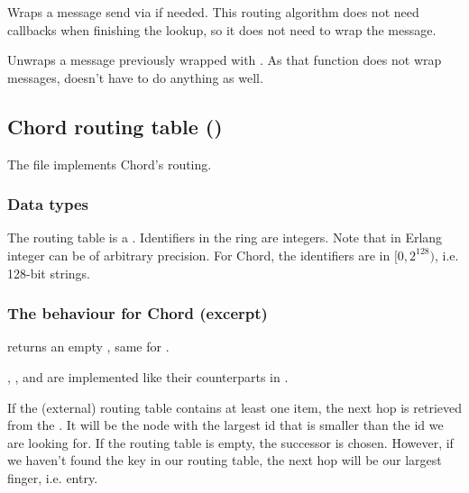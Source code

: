Wraps a message send via  if needed. This routing algorithm
does not need callbacks when finishing the lookup, so it does not need to wrap the
message.

Unwraps a message previously wrapped with . As that
function does not wrap messages,  doesn't have to do
anything as well.

\subsection{Chord routing table (\texorpdfstring{}{rt\_chord})}

The file  implements Chord's routing.

\subsubsection{Data types}


The routing table is a . Identifiers in the ring are
integers. Note that in Erlang integer can be of arbitrary
precision. For Chord, the identifiers are in $[0, 2^{128})$,
i.e. 128-bit strings.

\subsubsection{The \texorpdfstring{}{rm\_beh} behaviour for Chord (excerpt)}

 returns an empty , same for .

,
,
 and
 are implemented like their counterparts in
.

If the (external) routing table contains at least one item, the next hop is
retrieved from the . It will be the node with the largest id
that is smaller than the id we are looking for. If the routing table is empty,
the successor is chosen. However, if we haven't found the key in our routing
table, the next hop will be our largest finger, i.e. entry.

